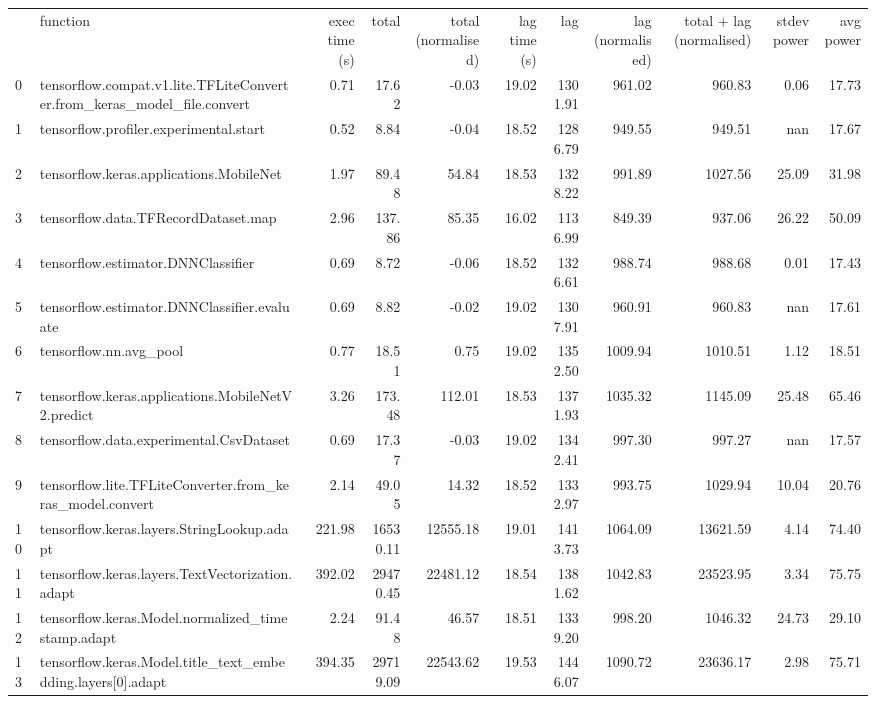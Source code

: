 \begin{tabular}{llrrrrrrrrr}
 & function & exec time (s) & total & total (normalised) & lag time (s) & lag & lag (normalised) & total + lag (normalised) & stdev power & avg power \\
0 & tensorflow.compat.v1.lite.TFLiteConverter.from_keras_model_file.convert & 0.71 & 17.62 & -0.03 & 19.02 & 1301.91 & 961.02 & 960.83 & 0.06 & 17.73 \\
1 & tensorflow.profiler.experimental.start & 0.52 & 8.84 & -0.04 & 18.52 & 1286.79 & 949.55 & 949.51 & nan & 17.67 \\
2 & tensorflow.keras.applications.MobileNet & 1.97 & 89.48 & 54.84 & 18.53 & 1328.22 & 991.89 & 1027.56 & 25.09 & 31.98 \\
3 & tensorflow.data.TFRecordDataset.map & 2.96 & 137.86 & 85.35 & 16.02 & 1136.99 & 849.39 & 937.06 & 26.22 & 50.09 \\
4 & tensorflow.estimator.DNNClassifier & 0.69 & 8.72 & -0.06 & 18.52 & 1326.61 & 988.74 & 988.68 & 0.01 & 17.43 \\
5 & tensorflow.estimator.DNNClassifier.evaluate & 0.69 & 8.82 & -0.02 & 19.02 & 1307.91 & 960.91 & 960.83 & nan & 17.61 \\
6 & tensorflow.nn.avg_pool & 0.77 & 18.51 & 0.75 & 19.02 & 1352.50 & 1009.94 & 1010.51 & 1.12 & 18.51 \\
7 & tensorflow.keras.applications.MobileNetV2.predict & 3.26 & 173.48 & 112.01 & 18.53 & 1371.93 & 1035.32 & 1145.09 & 25.48 & 65.46 \\
8 & tensorflow.data.experimental.CsvDataset & 0.69 & 17.37 & -0.03 & 19.02 & 1342.41 & 997.30 & 997.27 & nan & 17.57 \\
9 & tensorflow.lite.TFLiteConverter.from_keras_model.convert & 2.14 & 49.05 & 14.32 & 18.52 & 1332.97 & 993.75 & 1029.94 & 10.04 & 20.76 \\
10 & tensorflow.keras.layers.StringLookup.adapt & 221.98 & 16530.11 & 12555.18 & 19.01 & 1413.73 & 1064.09 & 13621.59 & 4.14 & 74.40 \\
11 & tensorflow.keras.layers.TextVectorization.adapt & 392.02 & 29470.45 & 22481.12 & 18.54 & 1381.62 & 1042.83 & 23523.95 & 3.34 & 75.75 \\
12 & tensorflow.keras.Model.normalized_timestamp.adapt & 2.24 & 91.48 & 46.57 & 18.51 & 1339.20 & 998.20 & 1046.32 & 24.73 & 29.10 \\
13 & tensorflow.keras.Model.title_text_embedding.layers[0].adapt & 394.35 & 29719.09 & 22543.62 & 19.53 & 1446.07 & 1090.72 & 23636.17 & 2.98 & 75.71 \\

\end{tabular}
